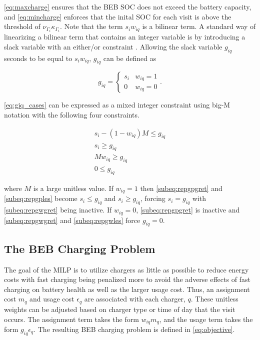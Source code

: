 \documentclass[ee,thesis]{usuthesis}
\begin{document}
\autoref{eq:maxcharge} ensures that the BEB SOC does not exceed the battery capacity, and \autoref{eq:mincharge}
enforces that the inital SOC for each visit is above the threshold of \(\nu_{\Gamma_i}\kappa_{\Gamma_i}\). Note that the term \(s_i w_{iq}\)
is a bilinear term. A standard way of linearizing a bilinear term that contains an integer variable is by introducing a
slack variable with an either/or constraint \cite{chen-2010-applied,rodriguez-2013-compar-asses}. Allowing the slack
variable \(g_{iq}\) seconds to be equal to \(s_i w_{iq}\), \(g_{iq}\) can be defined as

\begin{equation}
    \label{eq:giq_cases}
    g_{iq} =
    \begin{cases}
        s_i & w_{iq} = 1 \\
        0 & w_{iq} = 0
    \end{cases}.
\end{equation}

\autoref{eq:giq_cases} can be expressed as a mixed integer constraint using big-M notation with the following four
constraints.

\begin{subequations}
    \label{eq:slack_gain}
\begin{align}
    s_i - (1 - w_{iq})M \leq g_{iq}  \label{subeq:repgpgret} \\
    s_i \geq g_{iq}                 \label{subeq:repgples} \\
    Mw_{iq} \geq g_{iq}              \label{subeq:repgwgret} \\
    0 \leq g_{iq}                   \label{subeq:repgwles}
\end{align}
\end{subequations}

\noindent where \(M\) is a large unitless value. If \(w_{iq} = 1\) then \autoref{subeq:repgpgret} and
\autoref{subeq:repgples} become \(s_i \leq g_{iq}\) and \(s_i \geq g_{iq}\), forcing \(s_i = g_{iq}\) with \autoref{subeq:repgwgret}
being inactive. If \(w_{iq} = 0\), \autoref{subeq:repgpgret} is inactive and \autoref{subeq:repgwgret} and
\autoref{subeq:repgwles} force \(g_{iq} = 0\).

\subsection{The BEB Charging Problem}
\label{sec:BEB_MILP}
The goal of the MILP is to utilize chargers as little as possible to reduce energy costs with fast charging being
penalized more to avoid the adverse effects of fast charging on battery health as well as the
larger usage cost. Thus, an assignment cost \(m_q\) and usage cost \(\epsilon_q\) are associated with each charger, \(q\).
These unitless weights can be adjusted based on charger type or time of day that the visit
occurs. The assignment term takes the form \(w_{iq}m_q\), and the usage term takes the form \(g_{iq} \epsilon_q\). The
resulting BEB charging problem is defined in \autoref{eq:objective}.
\end{document}
